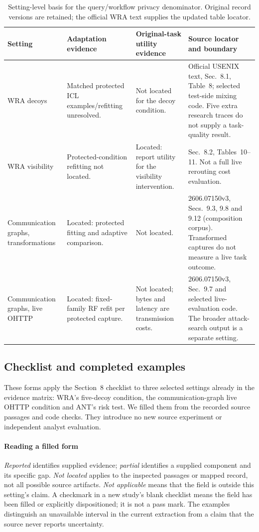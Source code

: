 \begin{table}[t]\centering\small
\caption{Setting-level basis for the query/workflow privacy denominator. Original record versions are retained; the official WRA text supplies the updated table locator.}\label{tab:availability-settings}
\begin{tabularx}{\textwidth}{@{}P{.18\textwidth}P{.21\textwidth}P{.24\textwidth}Y@{}}\toprule
Setting & Adaptation evidence & Original-task utility evidence & Source locator and boundary \\\midrule
WRA decoys & Matched protected ICL examples/refitting unresolved. & Not located for the decoy condition. & Official USENIX text, Sec.~8.1, Table~8; selected test-side mixing code. Five extra research traces do not supply a task-quality result. \\\addlinespace[3pt]
WRA visibility & Protected-condition refitting not located. & Located: report utility for the visibility intervention. & Sec.~8.2, Tables~10--11. Not a full live rerouting cost evaluation. \\\addlinespace[3pt]
Communication graphs, transformations & Located: protected fitting and adaptive comparison. & Not located. & 2606.07150v3, Secs.~9.3, 9.8 and 9.12 (composition corpus). Transformed captures do not measure a live task outcome. \\\addlinespace[3pt]
Communication graphs, live OHTTP & Located: fixed-family RF refit per protected capture. & Not located; bytes and latency are transmission costs. & 2606.07150v3, Sec.~9.7 and selected live-evaluation code. The broader attack-search output is a separate setting. \\\bottomrule
\end{tabularx}\end{table}

\subsection{Checklist and completed examples}


These forms apply the Section~8 checklist to three selected settings already in the evidence matrix: WRA's five-decoy condition, the communication-graph live OHTTP condition and ANT's risk test. We filled them from the recorded source passages and code checks. They introduce no new source experiment or independent analyst evaluation.

\paragraph{Reading a filled form} \emph{Reported} identifies supplied evidence; \emph{partial} identifies a supplied component and its specific gap. \emph{Not located} applies to the inspected passages or mapped record, not all possible source artifacts. \emph{Not applicable} means that the field is outside this setting's claim. A checkmark in a new study's blank checklist means the field has been filled or explicitly dispositioned; it is not a pass mark. The examples distinguish an unavailable interval in the current extraction from a claim that the source never reports uncertainty.

